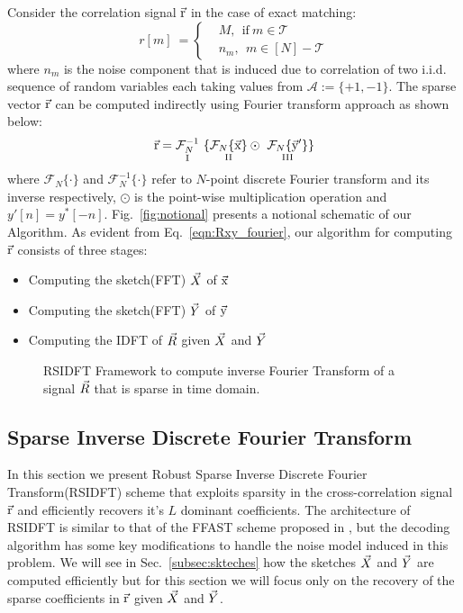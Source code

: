 \documentclass[journal,11pt,onecolumn]{IEEEtran}  %
\begin{document}
Consider the correlation signal $\vec{\mathrm{r}}$ in the case of exact matching:
\begin{equation} \label{eqn:RXY_sparse}
r[m] \ = \left\{
\begin{array}{ll}
  &M,~~  \text{if} \ m \in \mathcal{T} \\
  & n_m,~~ m \in [N]-\mathcal{T}
\end{array} 
\right.  
\end{equation}
where $n_m$ is the noise component that is induced due to correlation of two i.i.d. sequence of random variables each taking values from $\mathcal{A} := \{+1,-1\}$. The sparse vector $\vec{\mathrm{r}}$ can be computed indirectly using Fourier transform approach as shown below:
\begin{equation}\label{eqn:Rxy_fourier}
  \rv = \underset{\text{ \RNum{1} } } {\mathcal{F}_{N}^{-1}} \ \{ \underset{\text{ \RNum{2} } }{  \mathcal{F}_{N}\{\xv\}}  \odot \ \underset{\text{ \RNum{3} } }{ \mathcal{F}_{N}\{\yv'\}}  \} 
\end{equation} 
where $\mathcal{F}_{N}\{ \cdot \}$ and $\mathcal{F}_{N}^{-1}\{ \cdot \}$ refer to $N$-point discrete Fourier transform and its inverse respectively, $\odot$ is the point-wise multiplication operation and ${ y'[n]} = { y^{*}[-n]}$. Fig.~\ref{fig:notional} presents a notional schematic of our Algorithm. As evident from Eq.~\eqref{eqn:Rxy_fourier}, our algorithm for computing $\vec{\mathrm{r}}$ consists of three stages:
\begin{itemize}
\item Computing the sketch(FFT) $\vec{X}$ of $\vec{\mathrm{x}}$
\item Computing the sketch(FFT) $\vec{Y}$ of $\vec{\mathrm{y}}$
\item Computing the IDFT of $\vec{R}$ given $\vec{X}$ and $\vec{Y}$
\end{itemize}


	 \begin{figure}[t!]
	 	\begin{center}
	 	\resizebox{0.6\textwidth}{!}{}
	 	\end{center}	   
	 	\caption{ RSIDFT Framework to compute inverse Fourier Transform of a signal $\vec{R}$ that is sparse in time domain. }\label{fig:rsidft}
	\vspace{5 pt}
	 \end{figure}

\subsection{Sparse Inverse Discrete Fourier Transform}
\label{subsec:RSIDFT}	
 In this section we present Robust Sparse Inverse Discrete Fourier Transform(RSIDFT) scheme that exploits sparsity in the cross-correlation signal $\vec{\mathrm{r}}$ and efficiently recovers it's $L$ dominant coefficients. The architecture of RSIDFT is similar to that of the FFAST scheme proposed in \cite{pawar2014robust}, but the decoding algorithm has some key modifications to handle the noise model induced in this problem. We will see in Sec.~\ref{subsec:skteches} how the sketches $\vec{X}$ and $\vec{Y}$ are computed efficiently but for this section we will focus only on the recovery of the sparse coefficients in $\vec{\mathrm{r}}$ given $\vec{X}$ and $\vec{Y}$.
	  	  
\end{document}
